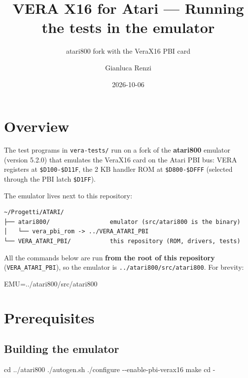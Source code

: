 \documentclass[
]{article}
\title{VERA X16 for Atari --- Running the tests in the emulator}
\subtitle{atari800 fork with the VeraX16 PBI card}
\author{Gianluca Renzi}
\date{2026-10-06}
\newenvironment{Shaded}{}{}
\newcommand{\AttributeTok}[1]{\textcolor[rgb]{0.49,0.56,0.16}{#1}}
\newcommand{\BuiltInTok}[1]{\textcolor[rgb]{0.00,0.50,0.00}{#1}}
\newcommand{\ExtensionTok}[1]{#1}
\newcommand{\FunctionTok}[1]{\textcolor[rgb]{0.02,0.16,0.49}{#1}}
\newcommand{\NormalTok}[1]{#1}
\newcommand{\OperatorTok}[1]{\textcolor[rgb]{0.40,0.40,0.40}{#1}}
\newcommand{\VariableTok}[1]{\textcolor[rgb]{0.10,0.09,0.49}{#1}}
\begin{document}
\maketitle

{
\hypersetup{linkcolor=}
\setcounter{tocdepth}{3}
\tableofcontents
}
\section{Overview}\label{overview}

The test programs in \texttt{vera-tests/} run on a fork of the
\textbf{atari800} emulator (version 5.2.0) that emulates the VeraX16
card on the Atari PBI bus: VERA registers at \texttt{\$D100-\$D11F}, the
2 KB handler ROM at \texttt{\$D800-\$DFFF} (selected through the PBI
latch \texttt{\$D1FF}).

The emulator lives next to this repository:

\begin{verbatim}
~/Progetti/ATARI/
├── atari800/                 emulator (src/atari800 is the binary)
│   └── vera_pbi_rom -> ../VERA_ATARI_PBI
└── VERA_ATARI_PBI/           this repository (ROM, drivers, tests)
\end{verbatim}

All the commands below are run \textbf{from the root of this repository}
(\texttt{VERA\_ATARI\_PBI}), so the emulator is
\texttt{../atari800/src/atari800}. For brevity:

\begin{Shaded}
\begin{Highlighting}[]
\VariableTok{EMU}\OperatorTok{=}\NormalTok{../atari800/src/atari800}
\end{Highlighting}
\end{Shaded}

\section{Prerequisites}\label{prerequisites}

\subsection{Building the emulator}\label{building-the-emulator}

\begin{Shaded}
\begin{Highlighting}[]
\BuiltInTok{cd}\NormalTok{ ../atari800}
\ExtensionTok{./autogen.sh}
\ExtensionTok{./configure} \AttributeTok{{-}{-}enable{-}pbi{-}verax16}
\FunctionTok{make}
\BuiltInTok{cd} \AttributeTok{{-}}
\end{Highlighting}
\end{Shaded}
\end{document}

